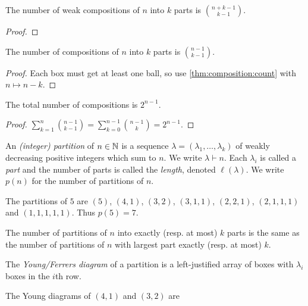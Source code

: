 \begin{proposition} \label{thm:composition:count}
    The number of weak compositions of $n$ into $k$ parts is
    $\binom{n+k-1}{k-1}$.
\end{proposition}
\begin{proof}
\end{proof}
\begin{corollary}
    The number of compositions of $n$ into $k$ parts is $\binom{n-1}{k-1}$.
\end{corollary}
\begin{proof}
    Each box must get at least one ball, so use \cref{thm:composition:count}
    with $n \mapsto n - k$.
\end{proof}
\begin{corollary}
    The total number of compositions is $2^{n-1}$.
\end{corollary}
\begin{proof}
    $\sum_{k=1}^{n} \binom{n-1}{k-1} = \sum_{k=0}^{n-1} \binom{n-1}{k}
    = 2^{n-1}$.
\end{proof}

\begin{definition*}[Partitions] \label{def:partitions}
    An \emph{(integer) partition} of $n \in \mathbb{N}$ is a sequence
    $\lambda = (\lambda_1, \dots, \lambda_k)$ of weakly decreasing positive
    integers which sum to $n$.
    We write $\lambda \vdash n$.
    Each $\lambda_i$ is called a \emph{part} and the number of parts is
    called the \emph{length}, denoted $\ell(\lambda)$.
    We write $p(n)$ for the number of partitions of $n$.
\end{definition*}
\begin{example}
    The partitions of $5$ are $(5)$, $(4, 1)$, $(3, 2)$, $(3, 1, 1)$,
    $(2, 2, 1)$, $(2, 1, 1, 1)$ and $(1, 1, 1, 1, 1)$.
    Thus $p(5) = 7$.
\end{example}

\begin{proposition} \label{thm:partitions:conjugate}
    The number of partitions of $n$ into exactly (resp. at most) $k$ parts
    is the same as the number of partitions of $n$ with largest part exactly
    (resp. at most) $k$.
\end{proposition}

\begin{definition} \label{def:young}
    The \emph{Young/Ferrers diagram} of a partition is a left-justified
    array of boxes with $\lambda_i$ boxes in the $i$th row.
\end{definition}
\begin{example}
    The Young diagrams of $(4, 1)$ and $(3, 2)$ are
    \begin{center}
         \qquad {}
    \end{center}
\end{example}

